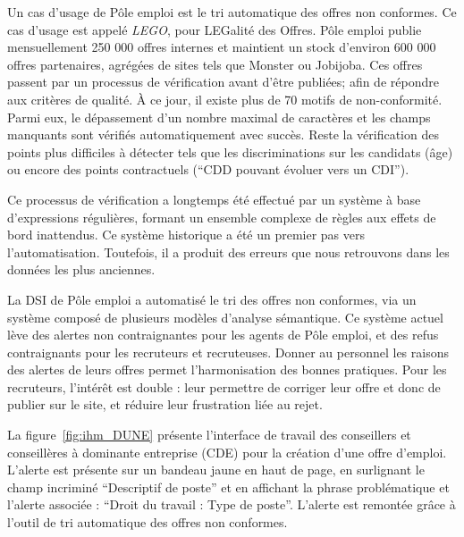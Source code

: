 Un cas d'usage de Pôle emploi est le tri automatique des offres non conformes. Ce cas d'usage est appelé \textit{LEGO}, pour LEGalité des Offres. Pôle emploi publie mensuellement 250 000 offres internes et maintient un stock d'environ 600 000 offres partenaires, agrégées de sites tels que Monster ou Jobijoba. Ces offres passent par un processus de vérification avant d'être publiées; afin de répondre aux critères de qualité. À ce jour, il existe plus de 70 motifs de non-conformité. Parmi eux, le dépassement d'un nombre maximal de caractères et les champs manquants sont vérifiés automatiquement avec succès. Reste la vérification des points plus difficiles à détecter tels que les discriminations sur les candidats (âge) ou encore des points contractuels (``CDD pouvant évoluer vers un CDI'').

Ce processus de vérification a longtemps été effectué par un système à base d'expressions régulières, formant un ensemble complexe de règles aux effets de bord inattendus. Ce système historique a été un premier pas vers l’automatisation. Toutefois, il a produit des erreurs que nous retrouvons dans les données les plus anciennes.

La DSI de Pôle emploi a automatisé le tri des offres non conformes, via un système composé de plusieurs modèles d'analyse sémantique. Ce système actuel lève des alertes non contraignantes pour les agents de Pôle emploi, et des refus contraignants pour les recruteurs et recruteuses. Donner au personnel les raisons des alertes de leurs offres permet l'harmonisation des bonnes pratiques. Pour les recruteurs, l'intérêt est double : leur permettre de corriger leur offre et donc de publier sur le site, et réduire leur frustration liée au rejet.

La figure~\ref{fig:ihm_DUNE} présente l'interface de travail des conseillers et conseillères à dominante entreprise (CDE) pour la création d'une offre d'emploi. L'alerte est présente sur un bandeau jaune en haut de page, en surlignant le champ incriminé ``Descriptif de poste'' et en affichant la phrase problématique et l'alerte associée : ``Droit du travail : Type de poste''.  L'alerte est remontée grâce à l'outil de tri automatique des offres non conformes.

